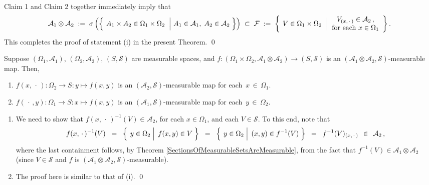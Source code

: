 \vskip 0.5cm
\noindent
Claim 1 and Claim 2 together immediately imply that
\begin{equation*}
\mathcal{A}_{1} \otimes \mathcal{A}_{2}
\; := \;
\sigma\left(
\left\{\;
	\left.
	A_{1} \times A_{2} \overset{{\color{white}.}}{\in} \Omega_{1} \times \Omega_{2}
	\;\;\right\vert\,
	A_{1} \in \mathcal{A}_{1},\;
	A_{2} \in \mathcal{A}_{2}
	\;\right\}
\right)
\;\subset\;
	\mathcal{F}
\; := \;
	\left\{\;\left.
	V \overset{{\color{white}.}}{\in} \Omega_{1}\times\Omega_{2}
	\,\;\right\vert
	\begin{array}{c} V_{(x,\,\cdot\,)} \in \mathcal{A}_{2}\,,\\ \textnormal{for each $x\in\Omega_{1}$} \end{array}
	\right\}.
\end{equation*}
This completes the proof of statement (i) in the present Theorem.
\qed

\begin{theorem}
\mbox{}\vskip0.1cm\noindent
Suppose
$\left(\Omega_{1},\mathcal{A}_{1}\right)$, $\left(\Omega_{2},\mathcal{A}_{2}\right)$, $\left(S,\mathcal{S}\right)$
are measurable spaces, and
$f : \left(\Omega_{1}\times\Omega_{2},\mathcal{A}_{1}\otimes\mathcal{A}_{2}\right) \longrightarrow \left(S,\mathcal{S}\right)$
is an $\left(\mathcal{A}_{1}\otimes\mathcal{A}_{2},\mathcal{S}\right)$-measurable map.
Then,
\begin{enumerate}
\item	$f{(x,\,\cdot\,)} : \Omega_{2} \longrightarrow S : y \longmapsto f(x,y)$
		is an $\left(\mathcal{A}_{2},\mathcal{S}\right)$-measurable map
		for each\, $x\,\in\,\Omega_{1}$.
\item	$f{(\,\cdot\,,y)} : \Omega_{1} \longrightarrow S : x \longmapsto f(x,y)$
		is an $\left(\mathcal{A}_{1},\mathcal{S}\right)$-measurable map
		for each\, $y\,\in\,\Omega_{2}$.
\end{enumerate}
\end{theorem}
\proof
\begin{enumerate}
\item
	We need to show that $f(x,\,\cdot\,)^{-1}\!\left(V\right) \in \mathcal{A}_{2}$,
	for each $x \in \Omega_{1}$, and each $V \in \mathcal{S}$.
	To this end, note that
	\begin{equation*}
	f(x,\,\cdot\,)^{-1}\!\left(V\right)
	\;\; = \;\;
		\left\{\;
		\left. y \overset{{\color{white}.}}{\in} \Omega_{2} \;\right\vert\; f(x,y) \in V
		\;\right\}
	\;\; = \;\;
		\left\{\;
		\left. y \overset{{\color{white}.}}{\in} \Omega_{2} \;\right\vert\; (x,y) \in f^{-1}(V)
		\;\right\}
	\;\; = \;\; f^{-1}(V)_{(x,\,\cdot\,)} \;\, \in \;\, \mathcal{A}_{2}\,,
	\end{equation*}
	where the last containment follows, by Theorem \ref{SectionsOfMeasurableSetsAreMeasurable},
	from the fact that $f^{-1}(V) \in \mathcal{A}_{1}\otimes\mathcal{A}_{2}$
	(since $V \in \mathcal{S}$ and $f$ is $(\mathcal{A}_{1}\otimes\mathcal{A}_{2},\mathcal{S})$-measurable).
\item
	The proof here is similar to that of (i).
	\qed
\end{enumerate}

